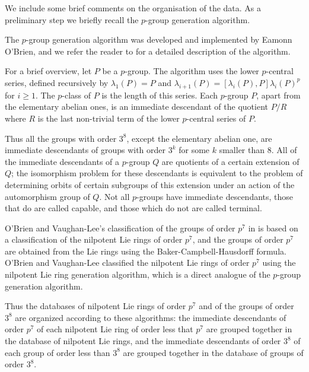

We include some brief comments on the organisation of the data. As a 
preliminary step we briefly recall the $p$-group generation algorithm.


The $p$-group generation algorithm was developed and implemented by Eamonn
O'Brien, and we refer the reader to \cite{OBrien90} for a detailed
description of the algorithm. 

For a brief overview, let $P$ be a $p$-group. The algorithm uses the lower 
$p$-central series, defined recursively by $\lambda_{1}(P)=P$ and 
$\lambda_{i+1}(P)=[\lambda_{i}(P),P]\lambda_{i}(P)^{p}$ for $i\geq 1$. 
The $p$-class of $P$ is the length of this series. Each $p$-group $P$, 
apart from the elementary abelian ones, is an immediate descendant of 
the quotient $P/R$ where $R$ is the last non-trivial term of the lower 
$p$-central series of $P$. 

Thus all the groups with order $3^{8}$, except the elementary abelian one, 
are immediate descendants of groups with order $3^{k}$ for some $k$ smaller
than $8$. All of 
the immediate descendants of a $p$-group $Q$ are quotients of a certain 
extension of $Q$; the isomorphism problem for these descendants is equivalent
to the problem of determining orbits of certain subgroups of this extension 
under an action of the automorphism group of $Q$. Not all $p$-groups have 
immediate descendants, those that do are called capable, and those which 
do not are called terminal. 

O'Brien and Vaughan-Lee's classification of the groups of order $p^{7}$ 
in \cite{OVL05} is based on a classification of the nilpotent Lie rings of 
order $p^{7}$, and the groups of order $p^{7}$ are obtained from the Lie 
rings using the Baker-Campbell-Hausdorff formula. O'Brien and Vaughan-Lee 
classified the nilpotent Lie rings of order $p^{7}$ using the nilpotent 
Lie ring generation algorithm, which is a direct analogue of the $p$-group 
generation algorithm. 

Thus the databases of nilpotent Lie rings of order 
$p^{7}$ and of the groups of order $3^{8}$ are organized according to these 
algorithms: the immediate descendants of order $p^{7}$ of each nilpotent 
Lie ring of order less that $p^{7}$ are grouped together in the database of 
nilpotent Lie rings, and the immediate descendants of order $3^{8}$ of each 
group of order less than $3^{8}$ are grouped together in the database of 
groups of order $3^{8}$.

